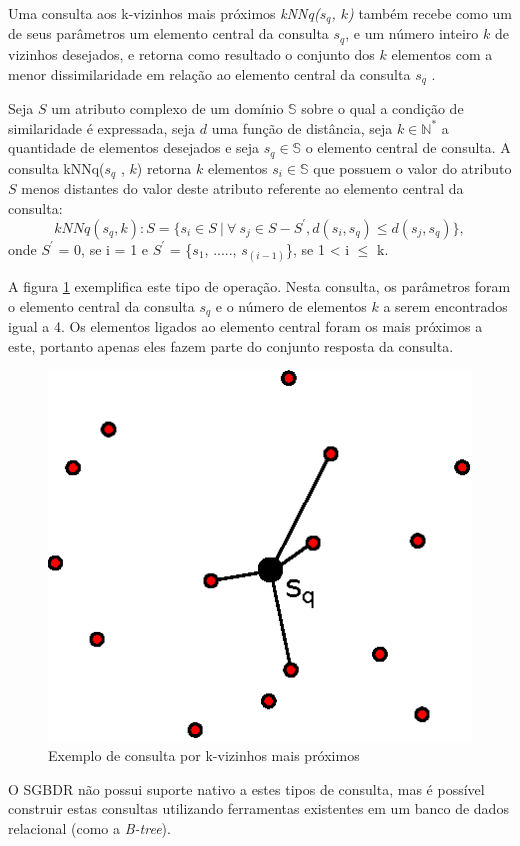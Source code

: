 Uma consulta aos k-vizinhos mais próximos \textit{kNNq($s_q$, $k$)} também recebe como um de seus parâmetros um elemento central da consulta $s_q$, e um número inteiro $k$ de vizinhos desejados, e retorna
como resultado o conjunto dos $k$ elementos com a menor dissimilaridade em relação ao elemento central da consulta $s_q$ \cite{POLA2010}.

\begin{mydef}
  \label{def:def_knnq}
  Seja $S$ um atributo complexo de um domínio $\mathbb{S}$ sobre o qual a condição de similaridade é expressada, seja $d$ uma
  função de distância, seja $k \in \mathbb{N^*}$ a quantidade de elementos desejados e seja $s_q \in \mathbb{S}$ o elemento
  central de consulta. A consulta kNNq($s_q$ , $k$) retorna $k$ elementos $s_i \in \mathbb{S}$ que possuem o valor do atributo $S$ menos distantes do valor 
  deste atributo referente ao elemento central da consulta\cite{Ferreira2009}:
  \begin{equation} \label{eq:knnq}   
    kNNq(s_q, k): S = \{s_i \in S \ |\  \forall \ s_j \in S - S^{'}, d(s_i, s_q)\leq d(s_j, s_q)\},
  \end{equation}
  onde $S^{'}$ = 0, se i = 1 e $S^{'}$ = \{$s_1$, ....., $s_{(i-1)}$\}, se 1 < i $\leq$ k. 
\end{mydef}

A figura \ref{fig:exemploknnq} exemplifica este tipo de operação. Nesta consulta, os parâmetros foram o elemento central da consulta $s_q$ e o número de elementos $k$ a serem
encontrados igual a 4. Os elementos ligados ao elemento central foram os mais próximos a este, portanto apenas eles fazem parte do conjunto resposta da consulta.
\begin{figure}[H]
\centering
\includegraphics[width=.3\textwidth]{dados/figuras/knnq.eps}
\caption{Exemplo de consulta por k-vizinhos mais próximos}
\label{fig:exemploknnq}
\end{figure}

O SGBDR não possui suporte nativo a estes tipos de consulta, mas é possível construir estas consultas utilizando ferramentas existentes em um banco de dados relacional (como a \textit{B-tree}).

